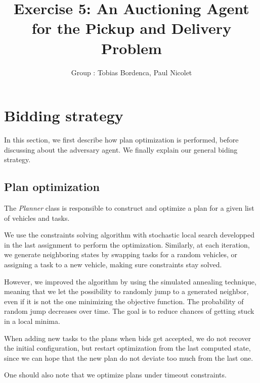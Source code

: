 \documentclass[11pt]{article}
\title{\bf Exercise 5: An Auctioning Agent for the Pickup and Delivery Problem}
\author{Group \textnumero 1: Tobias Bordenca, Paul Nicolet}
\begin{document}
\maketitle

\section{Bidding strategy}

In this section, we first describe how plan optimization is performed, before discussing about the adversary agent. We finally explain our general biding strategy.

\subsection{Plan optimization}
The \textit{Planner} class is responsible to construct and optimize a plan for a given list of vehicles and tasks.

We use the constraints solving algorithm with stochastic local search developped in the last assignment to perform the optimization. Similarly, at each iteration, we generate neighboring states by swapping tasks for a random vehicles, or assigning a task to a new vehicle, making sure constraints stay solved.

However, we improved the algorithm by using the simulated annealing technique, meaning that we let the possibility to randomly jump to a generated neighbor, even if it is not the one minimizing the objective function. The probability of random jump decreases over time. The goal is to reduce chances of getting stuck in a local minima.

When adding new tasks to the plans when bids get accepted, we do not recover the initial configuration, but restart optimization from the last computed state, since we can hope that the new plan do not deviate too much from the last one.

One should also note that we optimize plans under timeout constraints.
\end{document}
